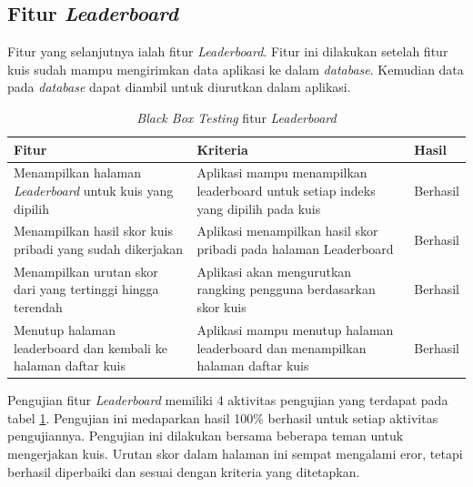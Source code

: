 \subsection{Fitur \textit{Leaderboard}}
Fitur yang selanjutnya ialah fitur \textit{Leaderboard}. Fitur ini dilakukan setelah fitur kuis sudah mampu mengirimkan data aplikasi ke dalam \textit{database}. Kemudian data pada \textit{database} dapat diambil untuk diurutkan dalam aplikasi.
\begin{table}[H]
	\caption{\textit{Black Box Testing} fitur \textit{Leaderboard}}
	\label{Tab:blackBoxLead}
	\begin{tabular}{|p{}|p{}|p{}|}
		\hline
		 \centering\textbf{Fitur} & \multicolumn{1}{m{0.45\textwidth}|}{\centering \textbf{Kriteria}}&  \multicolumn{1}{m{0.1\textwidth}|}{\centering \textbf{Hasil}}\\
		\hline
		Menampilkan halaman \textit{Leaderboard} untuk kuis yang dipilih
		&Aplikasi mampu menampilkan leaderboard untuk setiap indeks yang dipilih pada kuis 
		& Berhasil\\
		\hline
		Menampilkan hasil skor kuis pribadi yang sudah dikerjakan
		& Aplikasi menampilkan hasil skor pribadi pada halaman Leaderboard
		& Berhasil\\
		\hline
		Menampilkan urutan skor dari yang tertinggi hingga terendah
		& Aplikasi akan mengurutkan rangking pengguna berdasarkan skor kuis 
		& Berhasil\\
		\hline
		Menutup halaman leaderboard dan kembali ke halaman daftar kuis
		& Aplikasi mampu menutup halaman leaderboard dan menampilkan halaman daftar kuis
		& Berhasil\\
		\hline
	\end{tabular}
\end{table}
Pengujian fitur \textit{Leaderboard} memiliki 4 aktivitas pengujian yang terdapat pada tabel \ref*{Tab:blackBoxLead}.
Pengujian ini medaparkan hasil 100\% berhasil untuk setiap aktivitas pengujiannya. Pengujian ini dilakukan bersama beberapa teman untuk mengerjakan kuis.
Urutan skor dalam halaman ini sempat mengalami eror, tetapi berhasil diperbaiki dan sesuai dengan kriteria yang ditetapkan.
\newpage
